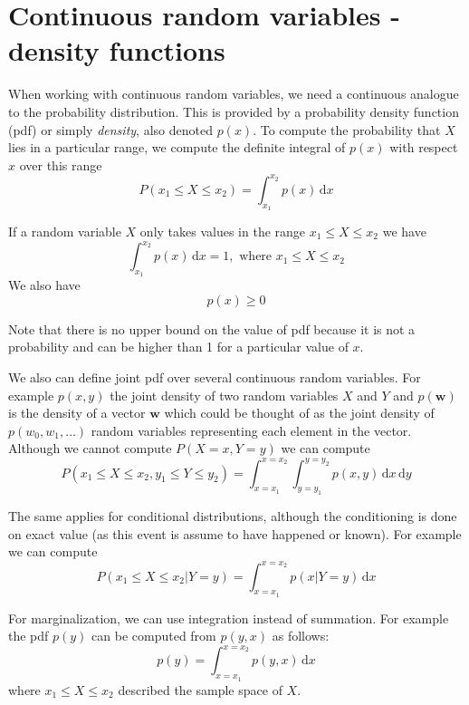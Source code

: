 \section{Continuous random variables - density functions}

When working with continuous random variables, we need a continuous analogue to the probability
distribution. This is provided by a probability density function (pdf) or simply \emph{density},
also denoted $p(x)$.
To compute the probability that $X$ lies in a particular range, we compute the
definite integral of $p(x)$ with respect $x$ over this range
\begin{equation*}
P(x_1 \leq X \leq x_2) = \int_{x_1}^{x_2} p(x)\,\mathrm{d}x
\end{equation*}

If a random variable $X$ only takes values in the range $x_1 \leq X \leq x_2$ we have
\begin{equation}
\int_{x_1}^{x_2} p(x)\,\mathrm{d}x = 1,\,\,\text{where } x_1 \leq X \leq x_2
\end{equation}
We also have
\begin{equation}
p(x) \geq 0
\end{equation}

Note that there is no upper bound on the value of pdf because it is not a probability and can
be higher than 1 for a particular value of $x$.

We also can define joint pdf over several continuous random variables.
For example $p(x,y)$ the joint density of two random variables $X$ and $Y$ and
$p(\mathbf{w})$ is the density of a vector $\mathbf{w}$ which could be thought of
as the joint density of $p(w_0, w_1, \ldots)$ random variables representing each
element in the vector. Although we cannot compute $P(X=x,Y=y)$ we can compute
\begin{equation}
P(x_1 \leq X \leq x_2, y_1 \leq Y \leq y_2) = 
\int_{x=x_1}^{x=x_2} \int_{y=y_1}^{y=y_2} p(x,y)\,\mathrm{d}x\,\mathrm{d}y
\end{equation}

The same applies for conditional distributions, although the conditioning is done
on exact value (as this event is assume to have happened or known). For example
we can compute
\begin{equation*}
P(x_1 \leq X \leq x_2 | Y = y) = \int_{x=x_1}^{x=x_{2}} p(x|Y=y)\,\mathrm{d}x
\end{equation*}

For marginalization, we can use integration instead of summation. For example the
pdf $p(y)$ can be computed from $p(y,x)$ as follows:
\begin{equation*}
p(y) = \int_{x=x_1}^{x=x_2} p(y,x)\,\mathrm{d}x
\end{equation*}
where $x_1 \leq X \leq x_2$ described the sample space of $X$.

